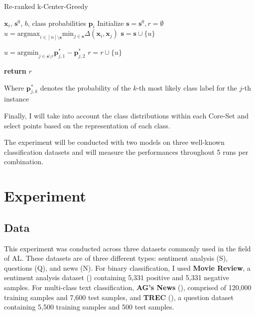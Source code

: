\documentclass[english,bachelor,ul]{webisthesis} %
\begin{document}
\begin{algorithm}
\caption{Re-ranked k-Center-Greedy}%
\makeatletter{}\makeatother
\label{alg:rwgc}
\begin{algorithmic}


\Require $ \mathbf{x}_i $, $ \mathbf{s}^0 $, $ b $, class probabilities $ \mathbf{p}_i $
\State Initialize $ \mathbf{s} = \mathbf{s}^0, r = \emptyset $
\Repeat
\State $ u = \text{argmax}_{i \in [n] \setminus \mathbf{s}} \text{min}_{j \in \mathbf{s}} \Delta(\mathbf{x}_i, \mathbf{x}_j) $
\State $ \mathbf{s} = \mathbf{s} \cup \{u\} $



\Repeat
\State $ u = \text{argmin}_{j \in \mathbf{s} \setminus r}\mathbf{p}_{j, 1}^* - \mathbf{p}_{j, 2}^* $
\State $ r = r \cup \{u\} $

\State \textbf{return} $ r $
\end{algorithmic}
\end{algorithm}
\noindent Where $ \mathbf{p}_{j, k}^* $ denotes the probability of the $ k $-th most likely class label for the $ j $-th instance 

Finally, I will take into account the class distributions within each Core-Set and select points based on the representation of each class.

The experiment will be conducted with two models on three well-known classification datasets and will measure the performances throughout 5 runs per combination. 

\chapter{Experiment}

\section{Data}

This experiment was conducted across three datasets commonly used in the field of AL. These datasets are of three different types: sentiment analysis (S), questions (Q), and news (N). For binary classification, I used \textbf{Movie Review}, a sentiment analysis dataset (\cite{DBLP:conf/acl/PangL05}) containing 5,331 positive and 5,331 negative samples. For multi-class text classification, \textbf{AG's News} (\cite{DBLP:conf/nips/ZhangZL15}), comprised of 120,000 training samples and 7,600 test samples, and \textbf{TREC} (\cite{DBLP:journals/nle/LiR06}), a question dataset containing 5,500 training samples and 500 test samples.
\end{document}
